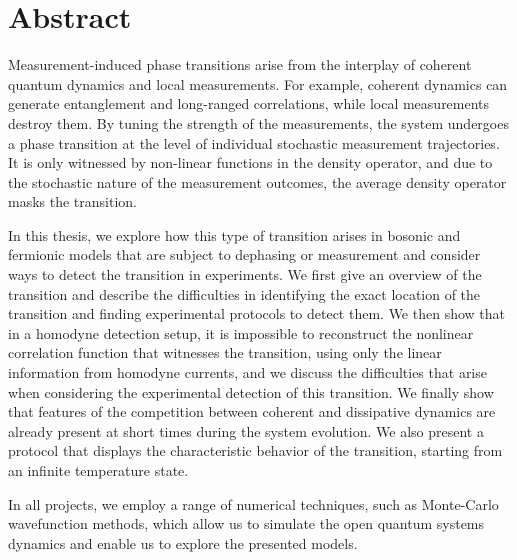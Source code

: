 \chapter*{Abstract}

Measurement-induced phase transitions arise from the interplay of coherent quantum dynamics and local measurements. For example, coherent dynamics can generate entanglement and long-ranged correlations, while local measurements destroy them. By tuning the strength of the measurements, the system undergoes a phase transition at the level of individual stochastic measurement trajectories. It is only witnessed by non-linear functions in the density operator, and due to the stochastic nature of the measurement outcomes, the average density operator masks the transition. 

In this thesis, we explore how this type of transition arises in bosonic and fermionic models that are subject to dephasing or measurement and consider ways to detect the transition in experiments. We first give an overview of the transition and describe the difficulties in identifying the exact location of the transition and finding experimental protocols to detect them. We then show that in a homodyne detection setup, it is impossible to reconstruct the nonlinear correlation function that witnesses the transition, using only the linear information from homodyne currents, and we discuss the difficulties that arise when considering the experimental detection of this transition. We finally show that features of the competition between coherent and dissipative dynamics are already present at short times during the system evolution. We also present a protocol that displays the characteristic behavior of the transition, starting from an infinite temperature state. 

In all projects, we employ a range of numerical techniques, such as Monte-Carlo wavefunction methods, which allow us to simulate the open quantum systems dynamics and enable us to explore the presented models.

\cleardoublepage
\restoregeometry

